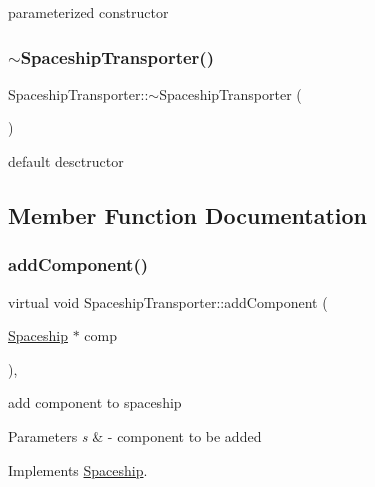 parameterized constructor \mbox{\label{classSpaceshipTransporter_a58a77ccda8effc3cfdb071c8ffa40929}} 
\subsubsection{\texorpdfstring{$\sim$\+Spaceship\+Transporter()}{~SpaceshipTransporter()}}
{\footnotesize\ttfamily Spaceship\+Transporter\+::$\sim$\+Spaceship\+Transporter (\begin{DoxyParamCaption}{ }\end{DoxyParamCaption})\hspace{0.3cm}{\ttfamily [inline]}}

default desctructor 

\subsection{Member Function Documentation}
\mbox{\label{classSpaceshipTransporter_acd55c6864eab86db5e0485beeec4e8b9}} 
\subsubsection{\texorpdfstring{add\+Component()}{addComponent()}}
{\footnotesize\ttfamily virtual void Spaceship\+Transporter\+::add\+Component (\begin{DoxyParamCaption}\item[{\hyperlink{classSpaceship}{Spaceship} $\ast$}]{comp }\end{DoxyParamCaption})\hspace{0.3cm}{\ttfamily [inline]}, {\ttfamily [virtual]}}

add component to spaceship 
\begin{DoxyParams}{Parameters}
{\em s} & -\/ component to be added \\
\hline
\end{DoxyParams}


Implements \hyperlink{classSpaceship_ac1b4673a691cd100708ddea08cd9f192}{Spaceship}.

